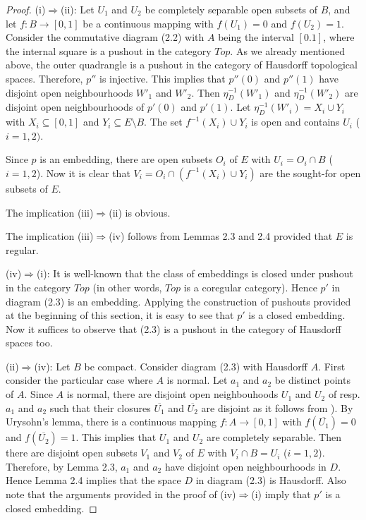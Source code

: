 \documentclass[12pt,reqno,intlim]{amsart}
\numberwithin{equation}{section}
\theoremstyle{definition}
\theoremstyle{remark}
\begin{document}
\begin{proof} (i)$\Rightarrow$(ii): Let $U_1$ and $U_2$ be completely separable open subsets of $B$, and let $f:B\rightarrow [0,1]$ be a continuous mapping with $f(U_1)=0$ and $f(U_2)=1$. Consider the  commutative diagram (2.2) with $A$ being the interval $[0.1]$,
where the internal square is a pushout in the category $Top$. As we already mentioned above, the outer quadrangle is a pushout in the category of Hausdorff topological spaces. Therefore, $p''$ is injective. This implies that  $p''(0)$ and $ p''(1)$ have disjoint open neighbourhoods $W'_1$ and $W'_2$. Then  $\eta_D^{-1}(W'_1)$ and $\eta_D^{-1}(W'_2)$ are disjoint open neighbourhoods of $p'(0)$ and $p'(1)$. Let $\eta_D^{-1}(W'_i)=X_i\cup Y_i$ with $X_i\subseteq [0,1]$ and $Y_i\subseteq E\setminus B$. The set  $f^{-1}(X_i)\cup Y_i$ is open and contains $U_i$ ($i=1,2)$.

Since $p$ is an embedding, there are open subsets $O_i$ of $E$ with $U_i=O_i\cap B$ ($i=1,2$). Now it is clear that $V_i=O_i\cap (f^{-1}(X_i)\cup Y_i)$ are the sought-for open subsets of $E$.


The implication (iii)$\Rightarrow$(ii) is obvious.

The implication (iii)$\Rightarrow$(iv) follows from Lemmas 2.3 and 2.4 provided that $E$ is regular.

(iv)$\Rightarrow$(i): It is well-known that the class of embeddings is closed under pushout in the category $Top$ (in other words, $Top$ is a coregular category). Hence $p'$ in diagram (2.3) is an embedding. Applying the construction of pushouts provided at the beginning of this section, it is easy to see that $p'$ is a closed embedding. Now it suffices to observe that (2.3) is a pushout in the category of Hausdorff spaces too.

(ii)$\Rightarrow$(iv): Let $B$ be compact. Consider diagram (2.3) with Hausdorff $A$. First consider the particular case where $A$ is normal. Let $a_1$ and $a_2$ be distinct points of $A$. Since $A$ is normal,  there are disjoint open neighbouhoods $U_1$ and $U_2$ of resp. $a_1$ and $a_2$ such that their closures $\overline{U_1}$ and $\overline{U_2}$ are disjoint as it follows from \cite[Lemma 31.1(b)]{Mu}). By Urysohn's lemma, there is a continuous mapping $f:A\rightarrow [0,1]$ with $f(\overline{U_1})=0$ and $f(\overline{U_2})=1$. This implies that $U_1$ and $U_2$ are completely separable. Then there are disjoint open subsets $V_1$ and $V_2$ of $E$ with $V_i\cap B=U_i$ ($i=1,2$). Therefore, by Lemma 2.3, $a_1$ and $a_2$ have disjoint open neighbourhoods in $D$. Hence Lemma 2.4 implies that the space $D$ in diagram (2.3) is Hausdorff. Also note that the  arguments provided in the proof of (iv)$\Rightarrow$(i) imply that $p'$ is a closed embedding.


\end{proof}
\end{document}
